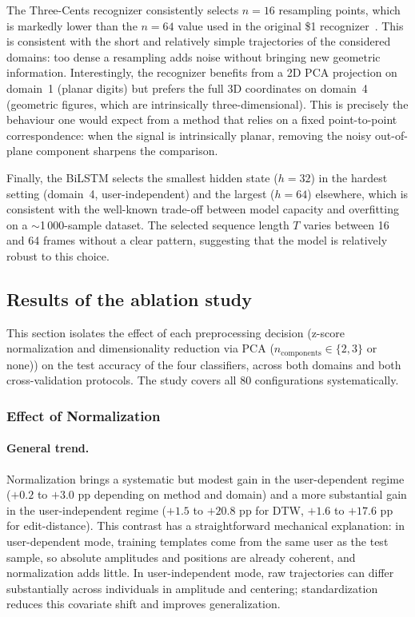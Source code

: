 The Three-Cents recognizer consistently selects $n = 16$ resampling points,
which is markedly lower than the $n = 64$ value used in the original \$1
recognizer~\cite{Wobbrock2007}. This is consistent with the short and
relatively simple trajectories of the considered domains: too dense a
resampling adds noise without bringing new geometric information. Interestingly,
the recognizer benefits from a 2D PCA projection on domain~1 (planar digits)
but prefers the full 3D coordinates on domain~4 (geometric figures, which are
intrinsically three-dimensional). This is precisely the behaviour one would
expect from a method that relies on a fixed point-to-point correspondence:
when the signal is intrinsically planar, removing the noisy out-of-plane
component sharpens the comparison.

Finally, the BiLSTM selects the smallest hidden state ($h = 32$) in the
hardest setting (domain~4, user-independent) and the largest ($h = 64$)
elsewhere, which is consistent with the well-known trade-off between model
capacity and overfitting on a $\sim$1\,000-sample dataset. The selected
sequence length $T$ varies between 16 and 64 frames without a clear pattern,
suggesting that the model is relatively robust to this choice.

\subsection{Results of the ablation study}
\label{subsec:ablation}

This section isolates the effect of each preprocessing decision (z-score normalization
and dimensionality reduction via PCA ($n_{\text{components}} \in \{2, 3\}$ or none))
on the test accuracy of the four classifiers, across both domains and both
cross-validation protocols. The study covers all 80 configurations systematically.

\subsubsection{Effect of Normalization}

\paragraph{General trend.}
Normalization brings a systematic but modest gain in the user-dependent regime
($+0.2$ to $+3.0$ pp depending on method and domain) and a more substantial gain in the
user-independent regime ($+1.5$ to $+20.8$ pp for DTW, $+1.6$ to $+17.6$ pp for
edit-distance). This contrast has a straightforward mechanical explanation: in
user-dependent mode, training templates come from the same user as the test sample, so
absolute amplitudes and positions are already coherent, and normalization adds little.
In user-independent mode, raw trajectories can differ substantially across individuals
in amplitude and centering; standardization reduces this covariate shift and improves
generalization.

